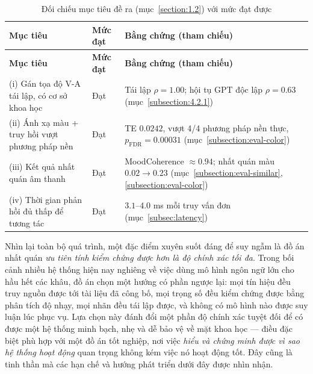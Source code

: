 \documentclass[../DoAn.tex]{subfiles}
\begin{document}
\begin{longtable}{|p{5.0cm}|p{1.8cm}|p{5.6cm}|}
\caption{Đối chiếu mục tiêu đề ra (mục~\ref{section:1.2}) với mức đạt được}\label{table:goal-achievement}\\
\hline
\textbf{Mục tiêu} & \textbf{Mức đạt} & \textbf{Bằng chứng (tham chiếu)} \\
\hline
\endfirsthead
\hline
\textbf{Mục tiêu} & \textbf{Mức đạt} & \textbf{Bằng chứng (tham chiếu)} \\
\hline
\endhead
(i) Gán tọa độ V-A tái lập, có cơ sở khoa học & Đạt & Tái lập $\rho=1.00$; hội tụ GPT độc lập $\rho=0.63$ (mục~\ref{subsection:4.2.1}) \\
\hline
(ii) Ánh xạ màu + truy hồi vượt phương pháp nền & Đạt & TE $0.0242$, vượt 4/4 phương pháp nền thực, $p_{\text{FDR}}=0.00031$ (mục~\ref{subsection:eval-color}) \\
\hline
(iii) Kết quả nhất quán âm thanh & Đạt & MoodCoherence $\approx 0.94$; nhất quán màu $0.02\to0.23$ (mục~\ref{subsection:eval-similar}, \ref{subsection:eval-color}) \\
\hline
(iv) Thời gian phản hồi đủ thấp để tương tác & Đạt & $3.1$--$4.0$ ms mỗi truy vấn đơn (mục~\ref{subsec:latency}) \\
\hline
\end{longtable}

Nhìn lại toàn bộ quá trình, một đặc điểm xuyên suốt đáng để suy ngẫm là đồ án nhất quán \textit{ưu tiên tính kiểm chứng được hơn là độ chính xác tối đa}. Trong bối cảnh nhiều hệ thống hiện nay nghiêng về việc dùng mô hình ngôn ngữ lớn cho hầu hết các khâu, đồ án chọn một hướng có phần ngược lại: mọi tín hiệu đều truy nguồn được tới tài liệu đã công bố, mọi trọng số đều kiểm chứng được bằng phân tích độ nhạy, mọi nhãn đều tái lập được, và không có mô hình nào được suy luận lúc phục vụ. Lựa chọn này đánh đổi một phần độ chính xác tuyệt đối để có được một hệ thống minh bạch, nhẹ và dễ bảo vệ về mặt khoa học --- điều đặc biệt phù hợp với một đồ án tốt nghiệp, nơi việc \textit{hiểu và chứng minh được vì sao hệ thống hoạt động} quan trọng không kém việc nó hoạt động tốt. Đây cũng là tinh thần mà các hạn chế và hướng phát triển dưới đây được nhìn nhận.
\end{document}

